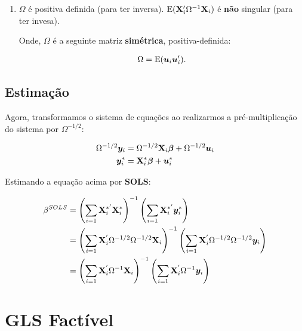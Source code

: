 \documentclass[11pt, oneside, a4paper, article]{article}
\numberwithin{equation}{section}
\begin{document}
\begin{description}
\begin{enumerate}
\item %

$\Omega$ é positiva definida (para ter inversa).
$\text{E}(\mathbf{X}_{i}^{\prime} \Omega^{-1} \mathbf{X}_{i})$ é \textbf{não} singular (para ter invesa).

Onde, $\Omega$ é a seguinte matriz \textbf{simétrica}, positiva-definida:

\vspace{-1.5 em}
\begin{align*}
\Omega = \text{E}(\boldsymbol{u}_{i} \boldsymbol{u}_{i}^{\prime}).
\end{align*}
\end{enumerate}

\subsection{Estimação}

Agora, transformamos o sistema de equações ao realizarmos a pré-multiplicação do sistema por $\Omega^{-1/2}$:

\vspace{-1.5 em}
\begin{align*}
\Omega^{-1/2} \boldsymbol{y}_{i} 
&=
\Omega^{-1/2} \mathbf{X}_{i} \boldsymbol{\beta}
+
\Omega^{-1/2} \boldsymbol{u}_{i}
\\
\boldsymbol{y}_{i}^{*}
&=
\mathbf{X}_{i}^{*} \boldsymbol{\beta}
+
\boldsymbol{u}^{*}_{i}
\end{align*}

Estimando a equação acima por \textbf{SOLS}:

\vspace{-1.5 em}
\begin{align*}
\beta^{SOLS}
&=
\left( \sum_{i=1} \mathbf{X}_{i}^{*'} \mathbf{X}_{i}^{*} \right)^{-1}
\left( \sum_{i=1} \mathbf{X}_{i}^{*'} \boldsymbol{y}_{i}^{*} \right)
\\
&=
\left( \sum_{i=1} \mathbf{X}_{i}^{'} \Omega^{-1/2} \Omega^{-1/2} \mathbf{X}_{i} \right)^{-1}
\left( \sum_{i=1} \mathbf{X}_{i}^{'} \Omega^{-1/2} \Omega^{-1/2} \boldsymbol{y}_{i} \right)
\\
&=
\left( \sum_{i=1} \mathbf{X}_{i}^{'} \Omega^{-1} \mathbf{X}_{i} \right)^{-1}
\left( \sum_{i=1} \mathbf{X}_{i}^{'} \Omega^{-1} \boldsymbol{y}_{i} \right)
\end{align*}


\clearpage
\section{GLS Factível}


\end{description}
\end{document}
